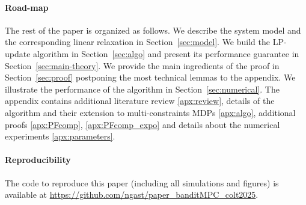 \paragraph{Road-map} The rest of the paper is organized as follows. We describe the system model and the corresponding linear relaxation in Section~\ref{sec:model}. We build the LP-update algorithm in Section~\ref{sec:algo} and present its performance guarantee in Section~\ref{sec:main-theory}.  We provide the main ingredients of the proof in Section~\ref{sec:proof} postponing the most technical lemmas to the appendix.  We illustrate the performance of the algorithm in Section~\ref{sec:numerical}. The appendix contains additional literature review \ref{apx:review}, details of the algorithm and their extension to multi-constraints MDPs \ref{apx:algo}, additional proofs \ref{apx:PFcomp}, \ref{apx:PFcomp_expo} and details about the numerical experiments \ref{apx:parameters}. 

\paragraph{Reproducibility} The code to reproduce this paper (including all simulations and figures) is available at \url{https://github.com/ngast/paper_banditMPC_colt2025}.



